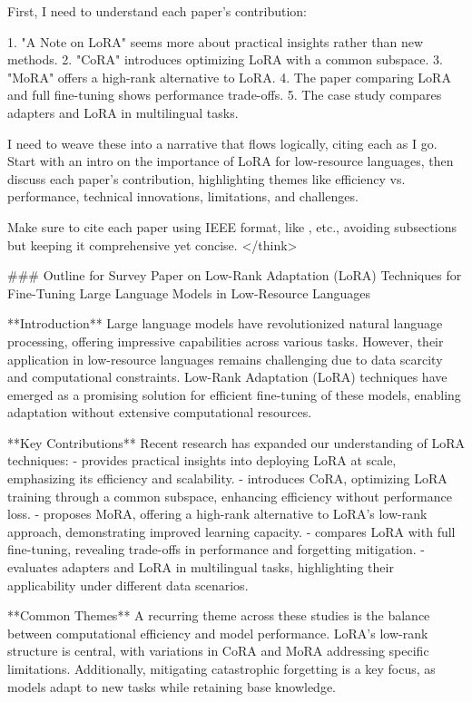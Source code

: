 \documentclass[conference]{IEEEtran}
\begin{document}
First, I need to understand each paper's contribution:

1. "A Note on LoRA" seems more about practical insights rather than new methods.
2. "CoRA" introduces optimizing LoRA with a common subspace.
3. "MoRA" offers a high-rank alternative to LoRA.
4. The paper comparing LoRA and full fine-tuning shows performance trade-offs.
5. The case study compares adapters and LoRA in multilingual tasks.

I need to weave these into a narrative that flows logically, citing each as I go. Start with an intro on the importance of LoRA for low-resource languages, then discuss each paper's contribution, highlighting themes like efficiency vs. performance, technical innovations, limitations, and challenges.

Make sure to cite each paper using IEEE format, like \cite{b1}, etc., avoiding subsections but keeping it comprehensive yet concise.
</think>

### Outline for Survey Paper on Low-Rank Adaptation (LoRA) Techniques for Fine-Tuning Large Language Models in Low-Resource Languages

**Introduction**
Large language models have revolutionized natural language processing, offering impressive capabilities across various tasks. However, their application in low-resource languages remains challenging due to data scarcity and computational constraints. Low-Rank Adaptation (LoRA) techniques have emerged as a promising solution for efficient fine-tuning of these models, enabling adaptation without extensive computational resources.

**Key Contributions**
Recent research has expanded our understanding of LoRA techniques:
- \cite{b1} provides practical insights into deploying LoRA at scale, emphasizing its efficiency and scalability.
- \cite{b2} introduces CoRA, optimizing LoRA training through a common subspace, enhancing efficiency without performance loss.
- \cite{b3} proposes MoRA, offering a high-rank alternative to LoRA's low-rank approach, demonstrating improved learning capacity.
- \cite{b4} compares LoRA with full fine-tuning, revealing trade-offs in performance and forgetting mitigation.
- \cite{b5} evaluates adapters and LoRA in multilingual tasks, highlighting their applicability under different data scenarios.

**Common Themes**
A recurring theme across these studies is the balance between computational efficiency and model performance. LoRA's low-rank structure is central, with variations in CoRA and MoRA addressing specific limitations. Additionally, mitigating catastrophic forgetting is a key focus, as models adapt to new tasks while retaining base knowledge.
\end{document}
